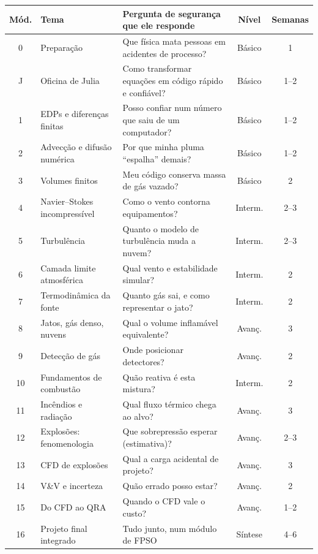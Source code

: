 \documentclass[10pt,a4paper,twocolumn,openany]{report}
\begin{document}
\begin{table}[!t]
\centering\small
\begin{tabularx}{\textwidth}{@{}clXcc@{}}
\toprule
Mód. & Tema & Pergunta de segurança que ele responde & Nível & Semanas\\
\midrule
0  & Preparação & Que física mata pessoas em acidentes de processo? & Básico & 1\\
J  & Oficina de Julia & Como transformar equações em código rápido e confiável? & Básico & 1--2\\
1  & EDPs e diferenças finitas & Posso confiar num número que saiu de um computador? & Básico & 1--2\\
2  & Advecção e difusão numérica & Por que minha pluma ``espalha'' demais? & Básico & 1--2\\
3  & Volumes finitos & Meu código conserva massa de gás vazado? & Básico & 2\\
4  & Navier--Stokes incompressível & Como o vento contorna equipamentos? & Interm. & 2--3\\
5  & Turbulência & Quanto o modelo de turbulência muda a nuvem? & Interm. & 2--3\\
6  & Camada limite atmosférica & Qual vento e estabilidade simular? & Interm. & 2\\
7  & Termodinâmica da fonte & Quanto gás sai, e como representar o jato? & Interm. & 2\\
8  & Jatos, gás denso, nuvens & Qual o volume inflamável equivalente? & Avanç. & 3\\
9  & Detecção de gás & Onde posicionar detectores? & Avanç. & 2\\
10 & Fundamentos de combustão & Quão reativa é esta mistura? & Interm. & 2\\
11 & Incêndios e radiação & Qual fluxo térmico chega ao alvo? & Avanç. & 3\\
12 & Explosões: fenomenologia & Que sobrepressão esperar (estimativa)? & Avanç. & 2--3\\
13 & CFD de explosões & Qual a carga acidental de projeto? & Avanç. & 3\\
14 & V\&V e incerteza & Quão errado posso estar? & Avanç. & 2\\
15 & Do CFD ao QRA & Quando o CFD vale o custo? & Avanç. & 1--2\\
16 & Projeto final integrado & Tudo junto, num módulo de FPSO & Síntese & 4--6\\
\bottomrule
\end{tabularx}
\par{}
\end{table}
\end{document}
